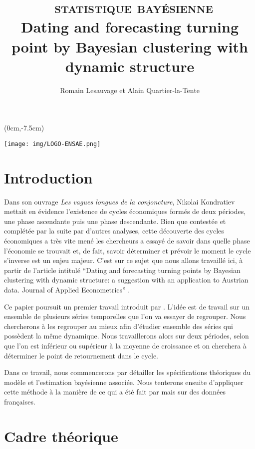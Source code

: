 \documentclass[10pt,french,french]{article}
\title{~\textsc{statistique bayésienne}\\
\hspace*{0.333em}Dating and forecasting turning point by Bayesian clustering with dynamic structure}
\author{Romain Lesauvage et Alain Quartier-la-Tente}
\date{}
\begin{document}
\maketitle


\begin{textblock*}{\textwidth}(0cm,-7.5cm)
\begin{center}
\texttt{[image: img/LOGO-ENSAE.png]}
\end{center}
\end{textblock*}

\hypertarget{introduction}{%
\section{Introduction}\label{introduction}}

Dans son ouvrage \emph{Les vagues longues de la conjoncture}, Nikolai Kondratiev mettait en évidence l'existence de cycles économiques formés de deux périodes, une phase ascendante puis une phase descendante. Bien que contestée et complétée par la suite par d'autres analyses, cette découverte des cycles économiques a très vite mené les chercheurs a essayé de savoir dans quelle phase l'économie se trouvait et, de fait, savoir déterminer et prévoir le moment le cycle s'inverse est un enjeu majeur. C'est sur ce sujet que nous allons travaillé ici, à partir de l'article intitulé ``Dating and forecasting turning points by Bayesian clustering with dynamic structure: a suggestion with an application to Austrian data. Journal of Applied Econometrics'' \cite{Kaufmann}.

Ce papier poursuit un premier travail introduit par \cite{FruhwirthKaufmann}. L'idée est de travail sur un ensemble de plusieurs séries temporelles que l'on va essayer de regrouper. Nous chercherons à les regrouper au mieux afin d'étudier ensemble des séries qui possèdent la même dynamique. Nous travaillerons alors sur deux périodes, selon que l'on est inférieur ou supérieur à la moyenne de croissance et on cherchera à déterminer le point de retournement dans le cycle.

Dans ce travail, nous commencerons par détailler les spécifications théoriques du modèle et l'estimation bayésienne associée. Nous tenterons ensuite d'appliquer cette méthode à la manière de ce qui a été fait par \cite{Kaufmann} mais sur des données françaises.

\hypertarget{cadre-thuxe9orique}{%
\section{Cadre théorique}\label{cadre-thuxe9orique}}
\end{document}
